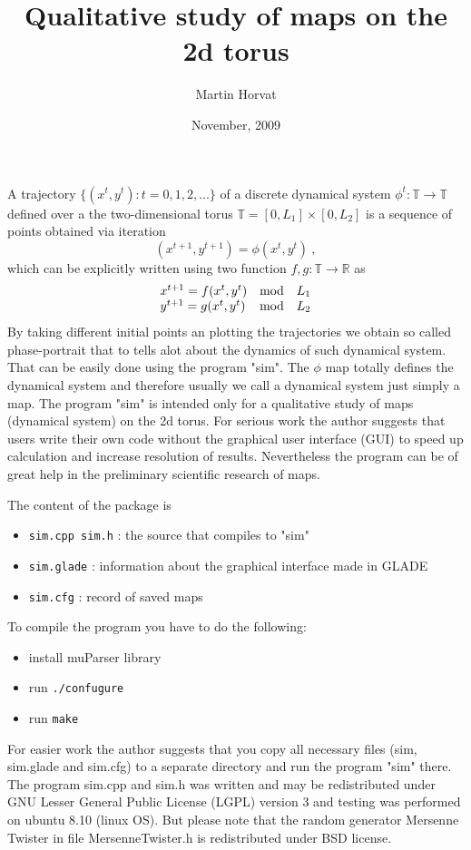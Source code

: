 \documentclass[11pt]{article}
\title{\vspace{-2cm}Qualitative study of maps on the 2d torus}
\author{Martin Horvat}
\date{November, 2009}
\begin{document}
\maketitle

A trajectory $\{(x^t,y^t) : t = 0, 1,2,...\}$ of a discrete dynamical system $\phi^t:\mathbb{T}\to\mathbb{T}$ defined over a the two-dimensional torus $\mathbb{T}=[0,L_1]\times[0,L_2]$ is a sequence of points obtained via iteration
%
$$
(x^{t+1},y^{t+1}) = \phi(x^t,y^t)\>,
$$ 
%
which can be explicitly written using two function $f,g:\mathbb{T} \to \mathbb{R}$ as
%
$$
\begin{array}{lll}x^{t+1} = f(x^t,y^t) & {\rm mod}& L_1\cr y^{t+1} = g(x^t,y^t) & {\rm mod}& L_2 \end{array}
$$
%
By taking different initial points an plotting the trajectories we obtain so called phase-portrait that to tells alot about the dynamics of such dynamical system. That can be easily done using the program "sim". The $\phi$ map totally defines the dynamical system and therefore usually we call a dynamical system just simply a map. The program "sim" is intended only for a qualitative study of maps (dynamical system) on the 2d torus. For serious work the author suggests that users write their own code without the graphical user interface (GUI) to speed up calculation and increase resolution of results. Nevertheless the program can be of great help in the preliminary scientific research of maps. 

The content of the package is
%
\begin{itemize}
\item \verb|sim.cpp sim.h| : the source that compiles to "sim"
\item \verb|sim.glade| : information about the graphical interface made in GLADE
\item \verb|sim.cfg| : record of saved maps
\end{itemize}

To compile the program you have to do the following:
%
\begin{itemize}
\item install muParser library
\item run \verb|./confugure|
\item run \verb|make|
\end{itemize}
%
For easier work the author suggests that you  copy all necessary files (sim, sim.glade and sim.cfg) to a separate directory and run the program "sim" there. The program sim.cpp and sim.h was written and may be redistributed under GNU Lesser General Public License (LGPL) version 3 and testing was performed on ubuntu 8.10 (linux OS). But please note that the random generator Mersenne Twister in file MersenneTwister.h is redistributed under BSD license.
\end{document}
